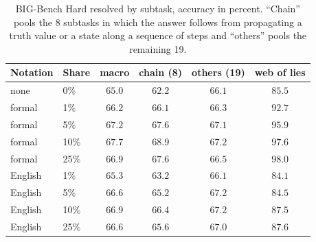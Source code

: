 \begin{table}[H]
\caption{BIG-Bench Hard resolved by subtask, accuracy in percent. ``Chain'' pools the 8 subtasks in which the answer follows from propagating a truth value or a state along a sequence of steps and ``others'' pools the remaining 19.}
\label{tab:bbh}
\begin{center}
\begin{tabular}{llcccc}
\toprule
Notation & Share & macro & chain (8) & others (19) & web of lies \\
\midrule
none    & 0\%  & $65.0$ & $62.2$ & $66.1$ & $85.5$ \\
formal  & 1\%  & $66.2$ & $66.1$ & $66.3$ & $92.7$ \\
formal  & 5\%  & $67.2$ & $67.6$ & $67.1$ & $95.9$ \\
formal  & 10\% & $\mathbf{67.7}$ & $\mathbf{68.9}$ & $67.2$ & $\mathbf{97.6}$ \\
formal  & 25\% & $66.9$ & $67.6$ & $66.5$ & $98.0$ \\
English & 1\%  & $65.3$ & $63.2$ & $66.1$ & $84.1$ \\
English & 5\%  & $66.6$ & $65.2$ & $67.2$ & $84.5$ \\
English & 10\% & $66.9$ & $66.4$ & $67.2$ & $87.5$ \\
English & 25\% & $66.6$ & $65.6$ & $67.0$ & $87.6$ \\
\bottomrule
\end{tabular}
\end{center}
\end{table}

